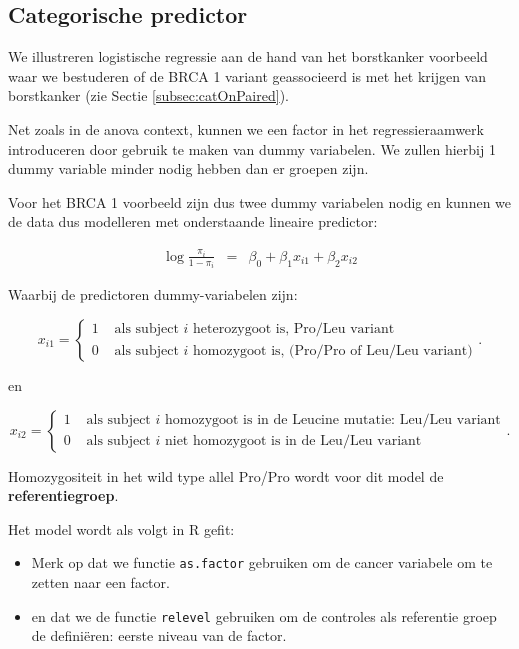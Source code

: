 \documentclass[
  12pt,dutch,coursenotes]{book}
\newcommand{\passthrough}[1]{#1}
\providecommand{\tightlist}{%
  \setlength{\itemsep}{0pt}\setlength{\parskip}{0pt}}
\theoremstyle{definition}
\theoremstyle{definition}
\theoremstyle{definition}
\theoremstyle{definition}
\theoremstyle{remark}
\begin{document}
\hypertarget{categorische-predictor}{%
\subsection{Categorische predictor}\label{categorische-predictor}}

We illustreren logistische regressie aan de hand van het borstkanker voorbeeld waar we bestuderen of de BRCA 1 variant geassocieerd is met het krijgen van borstkanker (zie Sectie \ref{subsec:catOnPaired}).

Net zoals in de anova context, kunnen we een factor in het regressieraamwerk introduceren door gebruik te maken van dummy variabelen.
We zullen hierbij 1 dummy variable minder nodig hebben dan er groepen zijn.

Voor het BRCA 1 voorbeeld zijn dus twee dummy variabelen nodig en kunnen we de data dus modelleren met onderstaande lineaire predictor:

\begin{eqnarray*}
  \log \frac{\pi_i}{1-\pi_i} &=& \beta_0+\beta_1 x_{i1} +\beta_2 x_{i2}
\end{eqnarray*}

Waarbij de predictoren dummy-variabelen zijn:

\[x_{i1} = \left\{ \begin{array}{ll}
1 & \text{ als subject $i$ heterozygoot is, Pro/Leu variant} \\
0 & \text{ als subject $i$ homozygoot is, (Pro/Pro of Leu/Leu variant)} \end{array}\right. .\]

en

\[x_{i2} = \left\{ \begin{array}{ll}
1 & \text{ als subject $i$ homozygoot is in de Leucine mutatie: Leu/Leu variant} \\
0 & \text{ als subject $i$ niet homozygoot is in de Leu/Leu variant} \end{array}\right. .\]

Homozygositeit in het wild type allel Pro/Pro wordt voor dit model de \textbf{referentiegroep}.

Het model wordt als volgt in R gefit:

\begin{itemize}
\tightlist
\item
  Merk op dat we functie \passthrough{\lstinline!as.factor!} gebruiken om de cancer variabele om te zetten naar een factor.
\item
  en dat we de functie \passthrough{\lstinline!relevel!} gebruiken om de controles als referentie groep de definiëren: eerste niveau van de factor.
\end{itemize}
\end{document}
